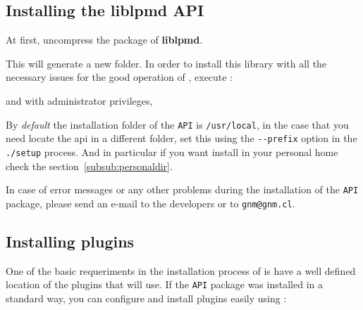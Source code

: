 
\subsection{Installing the liblpmd API}

At first, uncompress the package of \textbf{liblpmd}.


This will generate a new folder. In order to install this library with all the
necessary issues for the good operation of {\lpmd}, execute :


and with administrator privileges,


By \textit{default} the installation folder of the \verb|API| is
\verb|/usr/local|, in the case that you need locate the api in a different
folder, set this using the \verb|--prefix| option in the \verb|./setup|
process. And in particular if you want install {\lpmd} in your personal home
check the section~\ref{subsub:personaldir}.

In case of error messages or any other problems during the installation of the
\verb|API| package, please send an e-mail to the developers or to
\verb|gnm@gnm.cl|.

\subsection{Installing plugins}

One of the basic requeriments in the installation process of {\lpmd} is have a
well defined location of the plugins that {\lpmd} will use. If the \verb|API|
package was installed in a standard way, you can configure and install plugins
easily using :

